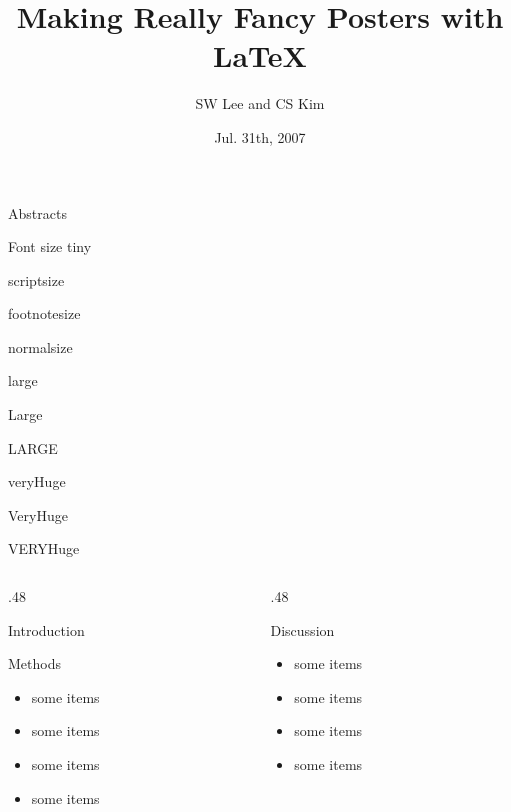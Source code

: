 \documentclass[final,hyperref={pdfpagelabels=false}]{beamer}
\title[Fancy Posters]{Making Really Fancy Posters with \LaTeX}
\author[Goo \& Lee]{SW Lee and CS Kim}
\institute[CNU \& CNU]{Chungnam National University }
\date{Jul. 31th, 2007}
\begin{document}
        \begin{frame}
        \begin{block}{\large Abstracts}
          \lipsum[1-2]
        \end{block}
        \begin{block}{\large Font size}
          \centering
          {\tiny tiny}\par
          {\scriptsize scriptsize}\par
          {\footnotesize footnotesize}\par
          {\normalsize normalsize}\par
          {\large large}\par
          {\Large Large}\par
          {\LARGE LARGE}\par
          {\veryHuge veryHuge}\par
          {\VeryHuge VeryHuge}\par
          {\VERYHuge VERYHuge}\par
        \end{block}
        \begin{columns}[t]
          \begin{column}{.48\linewidth}
            \begin{block}{Introduction}
              \lipsum[1-2]
            \end{block}
            \begin{block}{Methods}
              \begin{itemize}
              \item some items
              \item some items
              \item some items
              \item some items
              \end{itemize}
            \end{block}
          \end{column}
        \begin{column}{.48\linewidth}
        
        \begin{block}{Discussion}
          \begin{itemize}
          \item some items
          \item some items
          \item some items
          \item some items
          \end{itemize}
          \lipsum[1-1]
        \end{block}
        

\end{column}
\end{columns}
\end{frame}
\end{document}
